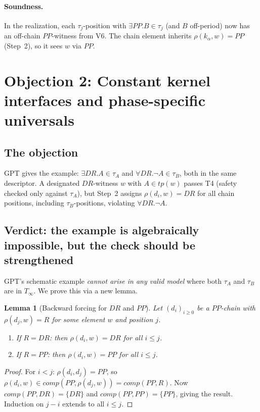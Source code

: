 \documentclass[11pt]{article}
\newcommand{\DR}{\mathit{DR}}
\newcommand{\PP}{\mathit{PP}}
\newcommand{\comp}{\mathit{comp}}
\newcommand{\tp}{\mathit{tp}}
\newtheorem{lemma}[theorem]{Lemma}
\theoremstyle{definition}
\begin{document}
\paragraph{Soundness.}
In the realization, each $\tau_j$-position with
$\exists\PP.B \in \tau_j$ (and $B$ off-period) now has an
off-chain $\PP$-witness from V6.  The chain element inherits
$\rho(k_\alpha, w) = \PP$ (Step~2), so it sees $w$ via $\PP$.

\section{Objection 2: Constant kernel interfaces and
phase-specific universals}

\subsection{The objection}

GPT gives the example: $\exists\DR.A \in \tau_A$ and
$\forall\DR.\neg A \in \tau_B$, both in the same descriptor.
A designated $\DR$-witness $w$ with $A \in \tp(w)$ passes T4
(safety checked only against $\tau_A$), but Step~2 assigns
$\rho(d_i, w) = \DR$ for all chain positions, including
$\tau_B$-positions, violating $\forall\DR.\neg A$.

\subsection{Verdict: the example is algebraically impossible,
but the check should be strengthened}

GPT's schematic example \emph{cannot arise in any valid model}
where both $\tau_A$ and $\tau_B$ are in $T_\infty$.  We prove
this via a new lemma.

\begin{lemma}[Backward forcing for $\DR$ and $\PP$]
\label{lem:backward}
Let $(d_i)_{i \ge 0}$ be a $\PP$-chain with
$\rho(d_j, w) = R$ for some element $w$ and position $j$.
\begin{enumerate}[label=(\alph*)]
\item If $R = \DR$: then $\rho(d_i, w) = \DR$ for all $i \le j$.
\item If $R = \PP$: then $\rho(d_i, w) = \PP$ for all $i \le j$.
\end{enumerate}
\end{lemma}

\begin{proof}
For $i < j$: $\rho(d_i, d_j) = \PP$, so
$\rho(d_i, w) \in \comp(\PP, \rho(d_j, w)) = \comp(\PP, R)$.
Now $\comp(\PP, \DR) = \{\DR\}$ and $\comp(\PP, \PP) = \{\PP\}$,
giving the result.  Induction on $j - i$ extends to all $i \le j$.
\end{proof}
\end{document}
